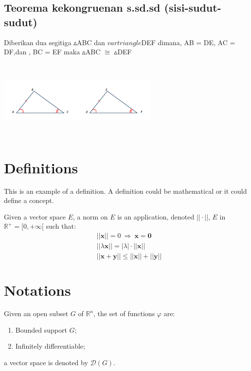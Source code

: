 \documentclass[11pt,fleqn]{book} %
\begin{document}
\subsection{Teorema kekongruenan s.sd.sd (sisi-sudut-sudut)}
\begin{theorem}
Diberikan dua segitiga $\vartriangle $ABC dan $vartriangle $DEF dimana, AB = DE, AC = DF,dan , BC = EF  maka $\vartriangle $ABC $\cong$ $\vartriangle $DEF
\end{theorem}
\includegraphics[width = 8cm, height= 4cm]{Pictures/7.png}

\section{Definitions}

This is an example of a definition. A definition could be mathematical or it could define a concept.

\begin{definition}
Given a vector space $E$, a norm on $E$ is an application, denoted $||\cdot||$, $E$ in $\mathbb{R}^+=[0,+\infty[$ such that:
\begin{align}
& ||\mathbf{x}||=0\ \Rightarrow\ \mathbf{x}=\mathbf{0}\\
& ||\lambda \mathbf{x}||=|\lambda|\cdot ||\mathbf{x}||\\
& ||\mathbf{x}+\mathbf{y}||\leq ||\mathbf{x}||+||\mathbf{y}||
\end{align}
\end{definition}


\section{Notations}

\begin{notation}
Given an open subset $G$ of $\mathbb{R}^n$, the set of functions $\varphi$ are:
\begin{enumerate}
\item Bounded support $G$;
\item Infinitely differentiable;
\end{enumerate}
a vector space is denoted by $\mathcal{D}(G)$. 
\end{notation}
\end{document}
